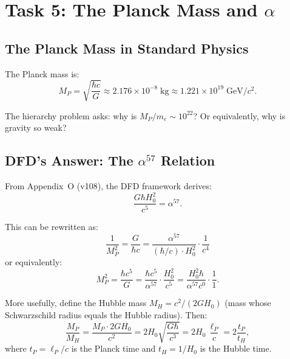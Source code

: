 \documentclass[11pt,a4paper]{article}
\begin{document}
\section{Task 5: The Planck Mass and $\alpha$}
\label{sec:planck-mass}

\subsection{The Planck Mass in Standard Physics}

The Planck mass is:
\begin{equation}
M_P = \sqrt{\frac{\hbar c}{G}} \approx 2.176 \times 10^{-8}\;\text{kg} \approx 1.221 \times 10^{19}\;\text{GeV}/c^2.
\end{equation}

The hierarchy problem asks: why is $M_P/m_e \sim 10^{22}$? Or equivalently, why is gravity so weak?

\subsection{DFD's Answer: The $\alpha^{57}$ Relation}

From Appendix~O (v108), the DFD framework derives:
\begin{equation}\label{eq:alpha57}
\boxed{\frac{G\hbar H_0^2}{c^5} = \alpha^{57}.}
\end{equation}

This can be rewritten as:
\begin{equation}
\frac{1}{M_P^2} = \frac{G}{\hbar c} = \frac{\alpha^{57}}{(\hbar/c)\cdot H_0^2} \cdot \frac{1}{c^4}
\end{equation}
or equivalently:
\begin{equation}
M_P^2 = \frac{\hbar c^5}{G} = \frac{\hbar c^5}{\alpha^{57}}\cdot\frac{H_0^2}{c^5} = \frac{H_0^2\hbar}{\alpha^{57} c^0} \cdot\frac{1}{1}.
\end{equation}

More usefully, define the Hubble mass $M_H = c^2/(2GH_0)$ (mass whose Schwarzschild radius equals the Hubble radius). Then:
\begin{equation}
\frac{M_P}{M_H} = \frac{M_P \cdot 2G H_0}{c^2} = 2H_0\sqrt{\frac{G\hbar}{c^3}} = 2H_0\,\frac{\ell_P}{c} = 2\frac{t_P}{t_H},
\end{equation}
where $t_P = \ell_P/c$ is the Planck time and $t_H = 1/H_0$ is the Hubble time.
\end{document}
